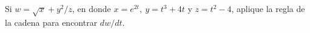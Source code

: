 \item Si $w = \sqrt{x} + y^2/z$, en donde $x = e^{2t}, \ y = t^3 + 4t$ y $z = t^2 - 4$, aplique la regla de la cadena para encontrar $dw/dt$.
